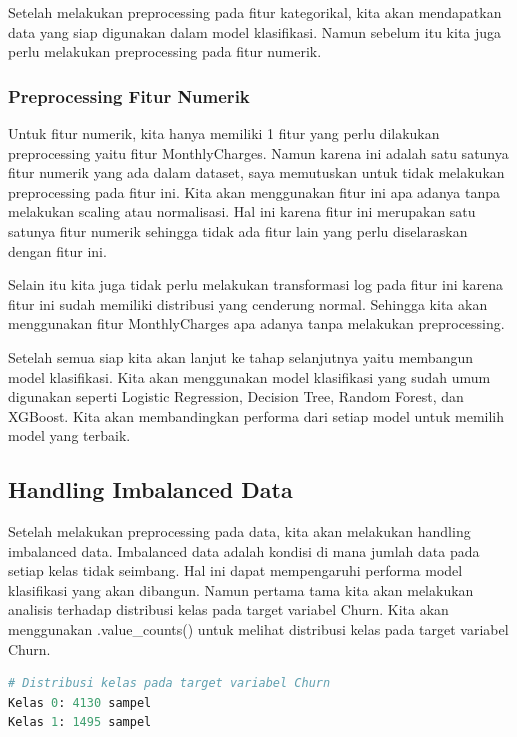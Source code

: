 Setelah melakukan preprocessing pada fitur kategorikal, kita akan mendapatkan data yang siap digunakan dalam model klasifikasi. Namun sebelum itu kita juga perlu melakukan preprocessing pada fitur numerik.

\newpage
\subsubsection{Preprocessing Fitur Numerik}
Untuk fitur numerik, kita hanya memiliki 1 fitur yang perlu dilakukan preprocessing yaitu fitur MonthlyCharges. Namun karena ini adalah satu satunya fitur numerik yang ada dalam dataset, saya memutuskan untuk tidak melakukan preprocessing pada fitur ini. Kita akan menggunakan fitur ini apa adanya tanpa melakukan scaling atau normalisasi. Hal ini karena fitur ini merupakan satu satunya fitur numerik sehingga tidak ada fitur lain yang perlu diselaraskan dengan fitur ini. 

Selain itu kita juga tidak perlu melakukan transformasi log pada fitur ini karena fitur ini sudah memiliki distribusi yang cenderung normal. Sehingga kita akan menggunakan fitur MonthlyCharges apa adanya tanpa melakukan preprocessing.

Setelah semua siap kita akan lanjut ke tahap selanjutnya yaitu membangun model klasifikasi. Kita akan menggunakan model klasifikasi yang sudah umum digunakan seperti Logistic Regression, Decision Tree, Random Forest, dan XGBoost. Kita akan membandingkan performa dari setiap model untuk memilih model yang terbaik.

\subsection{Handling Imbalanced Data}
Setelah melakukan preprocessing pada data, kita akan melakukan handling imbalanced data. Imbalanced data adalah kondisi di mana jumlah data pada setiap kelas tidak seimbang. Hal ini dapat mempengaruhi performa model klasifikasi yang akan dibangun. Namun pertama tama kita akan melakukan analisis terhadap distribusi kelas pada target variabel Churn. Kita akan menggunakan .value\_counts() untuk melihat distribusi kelas pada target variabel Churn.

\begin{lstlisting}[language=Python, caption=Distribusi Kelas pada Target Variabel Churn]
# Distribusi kelas pada target variabel Churn
Kelas 0: 4130 sampel
Kelas 1: 1495 sampel
\end{lstlisting}

